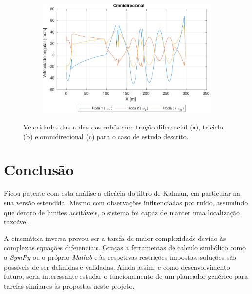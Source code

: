 \documentclass{article}
\begin{document}
\begin{figure}[ht]
     \begin{subfigure}[b]{0.49\textwidth}
         \centering
         \includegraphics[width=\textwidth]{figs/omni_wheels.pdf}
         \caption{}
         \label{fig:omni_wheels}
     \end{subfigure}
     \caption{Velocidades das rodas dos robôs com tração diferencial (a), triciclo (b) e omnidirecional (c) para o caso de estudo descrito.}
     \label{fig:wheel_speeds}
\end{figure}

\section{Conclusão}

Ficou patente com esta análise a eficácia do filtro de Kalman, em particular na sua versão estendida. Mesmo com observações influenciadas por ruído, assumindo que dentro de limites aceitáveis, o sistema foi capaz de manter uma localização razoável.

A cinemática inversa provou ser a tarefa de maior complexidade devido às complexas equações diferenciais. Graças a ferramentas de calculo simbólico como o \textit{SymPy} ou o próprio \textit{Matlab} e às respetivas restrições impostas, soluções são possíveis de ser definidas e validadas. Ainda assim, e como desenvolvimento futuro, seria interessante estudar o funcionamento de um planeador genérico para tarefas similares às propostas neste projeto.

% 
% 
\printbibliography
\end{document}

